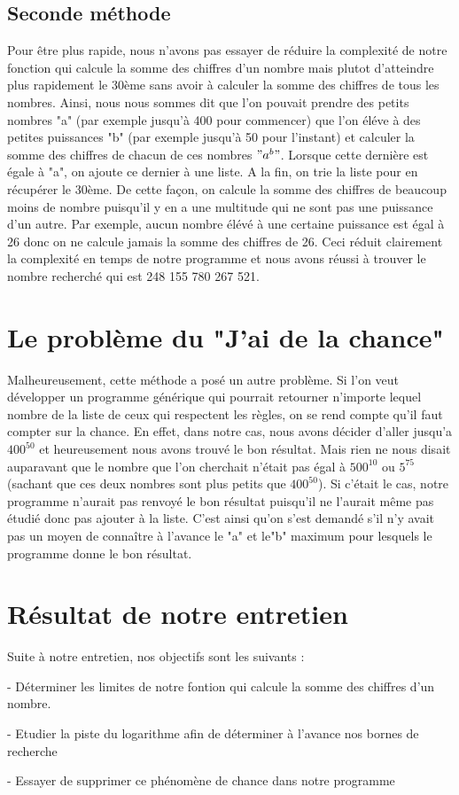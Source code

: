 \documentclass{article}
\begin{document}
\subsection{Seconde méthode}

Pour être plus rapide, nous n'avons pas essayer de réduire la complexité de notre fonction qui calcule la somme des chiffres d'un nombre mais plutot d'atteindre plus rapidement le 30ème sans avoir à calculer la somme des chiffres de tous les nombres. Ainsi, nous nous sommes dit que l'on pouvait prendre des petits nombres "a" (par exemple jusqu'à 400 pour commencer) que l'on éléve à des petites puissances "b" (par exemple jusqu'à 50 pour l'instant) et calculer la somme des chiffres de chacun de ces nombres $"a^{b}"$. Lorsque cette dernière est égale à "a", on ajoute ce dernier à une liste. A la fin, on trie la liste pour en récupérer le 30ème. De cette façon, on calcule la somme des chiffres de beaucoup moins de nombre puisqu'il y en a une multitude qui ne sont pas une puissance d'un autre. Par exemple, aucun nombre élévé à une certaine puissance est égal à 26 donc on ne calcule jamais la somme des chiffres de 26. Ceci réduit clairement la complexité en temps de notre programme et nous avons réussi à trouver le nombre recherché qui est 248 155 780 267 521.

\section{Le problème du "J'ai de la chance"}
Malheureusement, cette méthode a posé un autre problème. Si l'on veut développer un programme générique qui pourrait retourner n'importe lequel nombre de la liste de ceux qui respectent les règles, on se rend compte qu'il faut compter sur la chance. En effet, dans notre cas, nous avons décider d'aller jusqu'a $400^{50}$ et heureusement nous avons trouvé le bon résultat. Mais rien ne nous disait auparavant que le nombre que l'on cherchait n'était pas égal à $500^{10}$ ou $5^{75}$ (sachant que ces deux nombres sont plus petits que $400^{50}$). Si c'était le cas, notre programme n'aurait pas renvoyé le bon résultat puisqu'il ne l'aurait même pas étudié donc pas ajouter à la liste. C'est ainsi qu'on s'est demandé s'il n'y avait pas un moyen de connaître à l'avance le "a" et le"b" maximum pour lesquels le programme donne le bon résultat. 

\section{Résultat de notre entretien}
Suite à notre entretien, nos objectifs sont les suivants : 

- Déterminer les limites de notre fontion qui calcule la somme des chiffres d'un nombre.

- Etudier la piste du logarithme afin de déterminer à l'avance nos bornes de recherche

- Essayer de supprimer ce phénomène de chance dans notre programme
\end{document}
